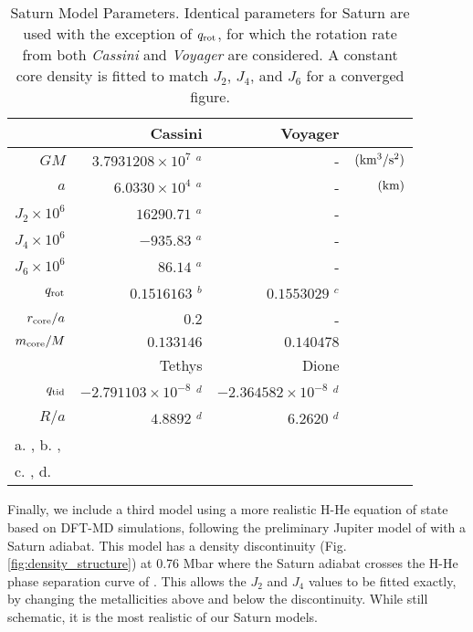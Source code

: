 %
\begin{table}
    \centering
\caption{Saturn Model Parameters. Identical parameters for Saturn are used with the
    exception of $q_{\rm rot}$, for which the rotation rate from both
    \textit{Cassini} and \textit{Voyager} are considered. A constant core density is
    fitted to match $J_2$, $J_4$, and $J_6$ for a converged figure.
    \label{tab:saturn_params}}
\begin{tabular}{rrrr}
        \hline
{} & Cassini  & Voyager & {} \\
\hline
$GM$ & $3.7931208 \times 10^{7}$ $^{a}$ & - & ${\rm (km^3/s^2) }$
\\
$a$ & $6.0330 \times 10^{4}$       $^{a}$ & - & ${\rm (km) }$  \\ 
$J_2  \times  10^6$  &  $16290.71$ $^{a}$ &  -  &       \\
$J_4  \times  10^6$  &  $-935.83$  $^{a}$ &  -  &       \\
$J_6  \times  10^6$  &  $86.14$    $^{a}$ &  -  &       \\
$q_{\rm rot} $  & $0.1516163$ $^{b}$ & $0.1553029$ $^{c}$ &\\
$r_{\rm core} / a$ & $0.2$ & - &  \\ 
$m_{\rm core} / M$  &  $0.133146$ & $0.140478$ &\\
\hline
\hline
  & Tethys  & Dione & \\
  \hline
$q_{\rm tid} $  & $-2.791103 \times 10^{-8} $ $^{d}$
& $-2.364582 \times 10^{-8}$ $^{d}$ & \\
$R/a $  & $4.8892$ $^{d}$ & $6.2620$ $^{d}$ & \\ 
\hline
\multicolumn{4}{l}{ a. \citet{Jacobson2006}, b. \citet{giampieri2006},} \\
\multicolumn{4}{l}{ c. \citet{desch1981}, d.  \citet{archinal2011}}
\end{tabular}
\end{table}


Finally, we include a third model using a more realistic H-He equation of state
based on DFT-MD simulations, following the preliminary Jupiter model of
\citet{hubbard2016} with a Saturn adiabat.  This model has a density
discontinuity (Fig. \ref{fig:density_structure}) at 0.76 Mbar where the Saturn
adiabat crosses the H-He phase separation curve of \citet{Morales2009}. This
allows the $J_2$ and $J_4$ values to be fitted exactly, by changing the
metallicities above and below the discontinuity. While still schematic, it is
the most realistic of our Saturn models.


